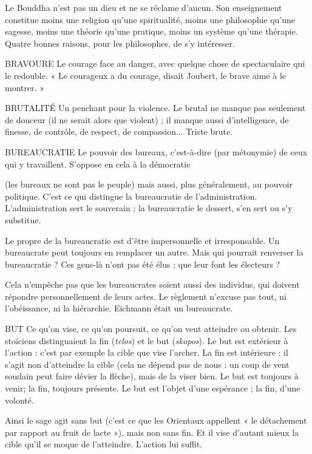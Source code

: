 Le Bouddha n’est pas un dieu et ne se réclame d’aucun. Son enseignement
constitue moins une religion qu’une spiritualité, moins une philosophie qu’une
sagesse, moins une théorie qu’une pratique, moins un système qu’une thérapie.
Quatre bonnes raisons, pour les philosophes, de s’y intéresser.

BRAVOURE Le courage face au danger, avec quelque chose de spectaculaire
qui le redouble. « Le courageux a du courage, disait Joubert, le
brave aime à le montrer. »

BRUTALITÉ Un penchant pour la violence. Le brutal ne manque pas seulement
de douceur (il ne serait alors que violent) ; il manque
aussi d'intelligence, de finesse, de contrôle, de respect, de compassion... Triste
brute.

BUREAUCRATIE Le pouvoir des bureaux, c’est-à-dire (par métonymie) de
ceux qui y travaillent. S’oppose en cela à la démocratie

(les bureaux ne sont pas le peuple) mais aussi, plus généralement, au pouvoir
politique. C’est ce qui distingue la bureaucratie de l'administration. L’administration
sert le souverain ; la bureaucratie le dessert, s’en sert ou s’y substitue.

Le propre de la bureaucratie est d’être impersonnelle et irresponsable. Un
bureaucrate peut toujours en remplacer un autre. Mais qui pourrait renverser la
bureaucratie ? Ces gens-là n’ont pas été élus ; que leur font les électeurs ?

Cela n'empêche pas que les bureaucrates soient aussi des individus, qui doivent
répondre personnellement de leurs actes. Le règlement n’excuse pas tout,
ni l’obéissance, ni la hiérarchie. Eichmann était un bureaucrate.

BUT Ce qu'on vise, ce qu’on poursuit, ce qu’on veut atteindre ou obtenir.
Les stoïciens distinguaient la fin ({\it telos}) et le but ({\it skopos}). Le but est
extérieur à l’action : c’est par exemple la cible que vise l’archer. La fin est
intérieure : il s’agit non d’atteindre la cible (cela ne dépend pas de nous : un
coup de vent soudain peut faire dévier la flèche), mais de la viser bien. Le but
est toujours à venir; la fin, toujours présente. Le but est l’objet d’une
espérance ; la fin, d’une volonté.

Ainsi le sage agit sans but (c’est ce que les Orientaux appellent « le détachement
par rapport au fruit de lacte »), mais non sans fin. Et il vise d’autant
mieux la cible qu’il se moque de l'atteindre. L'action lui suffit.

